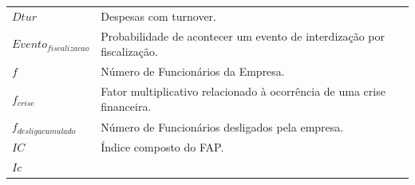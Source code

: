 \documentclass[]{article}
\begin{document}
\begin{longtable}[]{@{}ll@{}}
\begin{minipage}[t]{0.07\columnwidth}\raggedright\strut
\(Dtur\)\strut
\end{minipage} & \begin{minipage}[t]{0.87\columnwidth}\raggedright\strut
Despesas com turnover.\strut
\end{minipage}\tabularnewline
\begin{minipage}[t]{0.07\columnwidth}\raggedright\strut
\(Evento_{fiscalizacao}\)\strut
\end{minipage} & \begin{minipage}[t]{0.87\columnwidth}\raggedright\strut
Probabilidade de acontecer um evento de interdização por
fiscalização.\strut
\end{minipage}\tabularnewline
\begin{minipage}[t]{0.07\columnwidth}\raggedright\strut
\(f\)\strut
\end{minipage} & \begin{minipage}[t]{0.87\columnwidth}\raggedright\strut
Número de Funcionários da Empresa.\strut
\end{minipage}\tabularnewline
\begin{minipage}[t]{0.07\columnwidth}\raggedright\strut
\(f_{crise}\)\strut
\end{minipage} & \begin{minipage}[t]{0.87\columnwidth}\raggedright\strut
Fator multiplicativo relacionado à ocorrência de uma crise
financeira.\strut
\end{minipage}\tabularnewline
\begin{minipage}[t]{0.07\columnwidth}\raggedright\strut
\(f_{desligacumulado}\)\strut
\end{minipage} & \begin{minipage}[t]{0.87\columnwidth}\raggedright\strut
Número de Funcionários desligados pela empresa.\strut
\end{minipage}\tabularnewline
\begin{minipage}[t]{0.07\columnwidth}\raggedright\strut
\(IC\)\strut
\end{minipage} & \begin{minipage}[t]{0.87\columnwidth}\raggedright\strut
Índice composto do FAP.\strut
\end{minipage}\tabularnewline
\begin{minipage}[t]{0.07\columnwidth}\raggedright\strut
\(Ic\)\strut
\end{minipage} & \begin{minipage}[t]{0.87\columnwidth}\raggedright\strut

\end{minipage}
\end{longtable}
\end{document}
